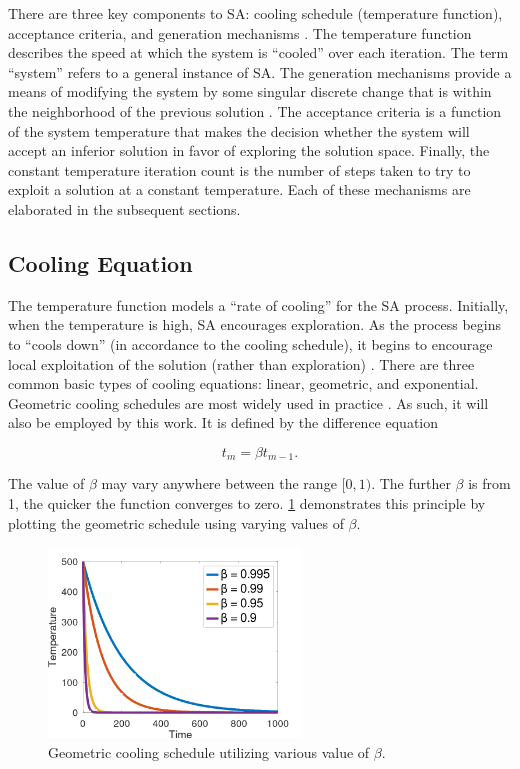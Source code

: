 \documentclass[energies,article,submit,moreauthors]{Definitions/mdpi}
\begin{document}
There are three key components to SA: cooling schedule (temperature function), acceptance criteria, and generation
mechanisms \cite{keller-2019-multi-objec,press-1992-numer-recip}. The temperature function describes the speed at
which the system is ``cooled'' over each iteration. The term ``system'' refers to a general instance of SA. The generation
mechanisms provide a means of modifying the system by some singular discrete change that is within the neighborhood of
the previous solution \cite{gendreau-2018-handb-metah}. The acceptance criteria is a function of the system temperature
that makes the decision whether the system will accept an inferior solution in favor of exploring the solution space.
Finally, the constant temperature iteration count is the number of steps taken to try to exploit a solution at a
constant temperature. Each of these mechanisms are elaborated in the subsequent sections.

\subsection{Cooling Equation}
\label{cooling-equation-experimental}
The temperature function models a ``rate of cooling'' for the SA process. Initially, when the temperature is high, SA
encourages exploration. As the process begins to ``cools down'' (in accordance to the cooling schedule), it begins to
encourage local exploitation of the solution (rather than exploration)
\cite{rutenbar-1989-simul-anneal-algor,henderson-1989-theor-pract}. There are three common basic types of cooling
equations: linear, geometric, and exponential. Geometric cooling schedules are most widely used in practice
\cite{keller-2019-multi-objec}. As such, it will also be employed by this work. It is defined by the difference
equation

\begin{equation}
\label{eq:cool}
t_m = \beta t_{m-1}\text{.}
\end{equation}

The value of \(\beta\) may vary anywhere between the range \([0,1)\). The further \(\beta\) is from 1, the quicker the function
converges to zero. \ref{fig:geometric} demonstrates this principle by plotting the geometric schedule using varying
values of \(\beta\).

\begin{figure}[t!]
  \centering \includegraphics[width=0.6\textwidth]{img/geometric.png}
  \caption{Geometric cooling schedule utilizing various value of $\beta$.}
  \label{fig:geometric}
\end{figure}
\end{document}
